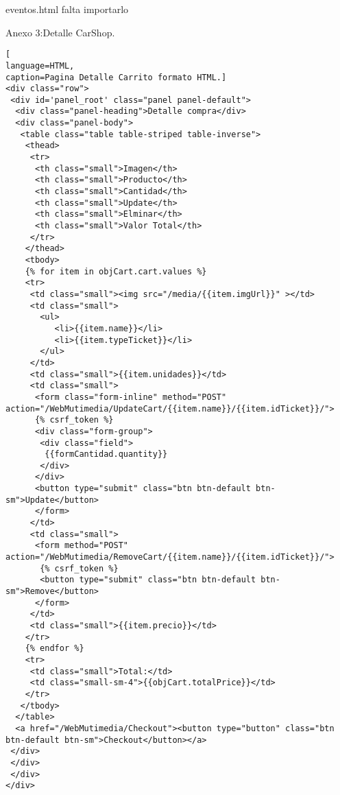 eventos.html
falta importarlo

Anexo 3:Detalle CarShop.
\begin{lstlisting}[
language=HTML,
caption=Pagina Detalle Carrito formato HTML.]
<div class="row">
 <div id='panel_root' class="panel panel-default">
  <div class="panel-heading">Detalle compra</div>
  <div class="panel-body">
   <table class="table table-striped table-inverse">
    <thead>
     <tr>
      <th class="small">Imagen</th>
      <th class="small">Producto</th>
      <th class="small">Cantidad</th>
      <th class="small">Update</th>
      <th class="small">Elminar</th>
      <th class="small">Valor Total</th>
     </tr>
    </thead>
    <tbody>
    {% for item in objCart.cart.values %}
    <tr>
     <td class="small"><img src="/media/{{item.imgUrl}}" ></td>
     <td class="small">
       <ul>
          <li>{{item.name}}</li>
          <li>{{item.typeTicket}}</li>
       </ul>
     </td>
     <td class="small">{{item.unidades}}</td>
     <td class="small">
      <form class="form-inline" method="POST" action="/WebMutimedia/UpdateCart/{{item.name}}/{{item.idTicket}}/">
      {% csrf_token %}	
      <div class="form-group">
       <div class="field">
        {{formCantidad.quantity}}
       </div>
      </div>
      <button type="submit" class="btn btn-default btn-sm">Update</button>
      </form>
     </td>
     <td class="small">
      <form method="POST" action="/WebMutimedia/RemoveCart/{{item.name}}/{{item.idTicket}}/">	
       {% csrf_token %}
       <button type="submit" class="btn btn-default btn-sm">Remove</button>
      </form>
     </td>
     <td class="small">{{item.precio}}</td>
    </tr>
    {% endfor %}
    <tr>
     <td class="small">Total:</td>
     <td class="small-sm-4">{{objCart.totalPrice}}</td>
    </tr>
   </tbody>
  </table>
  <a href="/WebMutimedia/Checkout"><button type="button" class="btn btn-default btn-sm">Checkout</button></a>
 </div>
 </div>
 </div>
</div>
\end{lstlisting}


